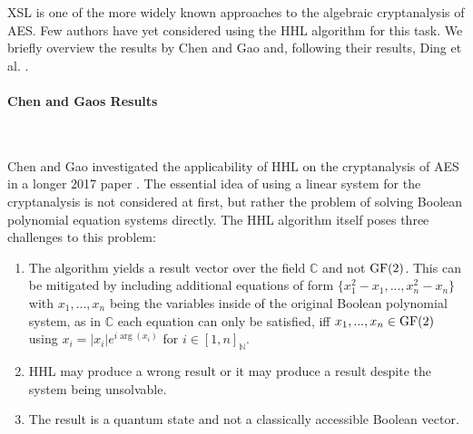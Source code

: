 XSL is one of the more widely known approaches to the algebraic cryptanalysis of AES. Few authors have yet considered using the HHL algorithm for this task. We briefly overview the results by Chen and Gao \cite{Chen2017,Gao2022} and, following their results, Ding et al. \cite{Ding2021}.

\paragraph*{Chen and Gaos Results} \label{chen_and_gaos_results} \phantom{}\\\phantom{}

Chen and Gao investigated the applicability of HHL on the cryptanalysis of AES in a longer 2017 paper \cite{Chen2017}. The essential idea of using a linear system for the cryptanalysis is not considered at first, but rather the problem of solving Boolean polynomial equation systems directly. The HHL algorithm itself poses three challenges to this problem:
\begin{enumerate}[label=(\roman*)]
    \item The algorithm yields a result vector over the field \(\mathbb{C}\) and not \(\operatorname{GF}(2)\). This can be mitigated by including additional equations of form \(\{x_1^2-x_1, ..., x_n^2-x_n\}\) with \(x_1, ..., x_n\) being the variables inside of the original Boolean polynomial system, as in \(\mathbb{C}\) each equation can only be satisfied, iff \(x_1, ..., x_n \in \operatorname{GF}(2)\) using \(x_i = |x_i|e^{i\arg(x_i)}\) for \(i \in [1, n]_{\mathbb{N}}\).
    \item HHL may produce a wrong result or it may produce a result despite the system being unsolvable.
    \item The result is a quantum state and not a classically accessible Boolean vector.
\end{enumerate}

